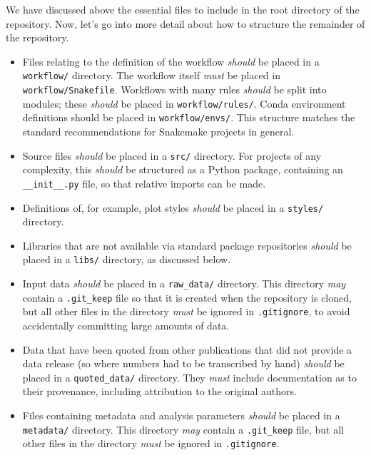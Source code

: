 \documentclass{article}
\newcommand\rfcword[1]{\emph{#1}\xspace}
\newcommand\must{\rfcword{must}}
\newcommand\should{\rfcword{should}}
\newcommand\may{\rfcword{may}}
\newcommand\filename[1]{\texttt{#1}\xspace}
\begin{document}
We have discussed above the essential files to include in the root directory of the repository.
Now,
let's go into more detail about how to structure the remainder of the repository.

\begin{itemize}
  \item
        Files relating to the definition of the workflow \should be placed in a \filename{workflow/} directory.
        The workflow itself \must be placed in \filename{workflow/Snakefile}.
        Workflows with many rules \should be split into modules;
        these \should be placed in \filename{workflow/rules/}.
        Conda environment definitions should be placed in \filename{workflow/envs/}.
        This structure matches the standard recommendations for Snakemake projects in general.
  \item
        Source files \should be placed in a \filename{src/} directory.
        For projects of any complexity,
        this \should be structured as a Python package,
        containing an \filename{\_\_init\_\_.py} file,
        so that relative imports can be made.
  \item
        Definitions of,
        for example,
        plot styles \should be placed in a \filename{styles/} directory.
  \item
        Libraries that are not available via standard package repositories
        \should be placed in a \filename{libs/} directory,
        as discussed below.
  \item
        Input data \should be placed in a \filename{raw\_data/} directory.
        This directory \may contain a \filename{.git\_keep} file
        so that it is created when the repository is cloned,
        but all other files in the directory \must be ignored in \filename{.gitignore},
        to avoid accidentally committing large amounts of data.
  \item
        Data that have been quoted from other publications
        that did not provide a data release
        (so where numbers had to be transcribed by hand)
        \should be placed in a \filename{quoted\_data/} directory.
        They \must include documentation as to their provenance,
        including attribution to the original authors.
  \item
        Files containing metadata and analysis parameters
        \should be placed in a \filename{metadata/} directory.
        This directory \may contain a \filename{.git\_keep} file,
        but all other files in the directory \must be ignored in \filename{.gitignore}.

\end{itemize}
\end{document}
